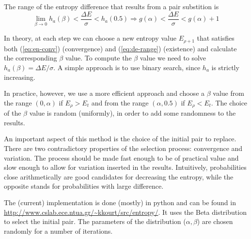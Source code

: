 \documentclass[9pt,a4paper]{article}
\begin{document}
The range of the entropy difference that results from a pair substition is
\begin{equation}
 \lim_{\beta \to 0}h_a(\beta) < \frac{\Delta E}{\sigma} <  h_a(0.5) \Rightarrow 
 g(\alpha) < \frac{\Delta E}{\sigma} < g(\alpha) + 1
 \label{eq:de-range}
\end{equation}


In theory, at each step we can choose a new entropy value \( E_{\rho+1} \) that
satisfies both (\ref{eq:en-conv})  (convergence) and (\ref{eq:de-range})
(existence) and calculate the corresponding $\beta$ value. To compute the
$\beta$ value we need to solve \( h_a(\beta) = {\Delta E}/\sigma \). A simple
approach is to use binary search, since $h_a$ is strictly increasing. 

In practice, however, we use a more efficient approach and choose a $\beta$
value from the range $(0,\alpha)$ if $E_\rho > E_t$ and from the range
$(\alpha,0.5)$ if  $E_\rho < E_t$. The choice of the $\beta$ value is random
(uniformly), in order to add some randomness to the results.

An important aspect of this method is the choice of the initial pair to
replace. There are two contradictory properties of the selection process:
convergence and variation. The process should be made fast enough to be of
practical value and slow enough to allow for variation inserted in the results.
Intuitively, probabilities close arithmetically are good candidates for
decreasing the entropy, while the opposite stands for probabilities with large
difference.

The (current) implementation is done (mostly) in python and can be found in
\url{http://www.cslab.ece.ntua.gr/~kkourt/src/entropy/}. It uses the Beta
distribution to select the initial pair. The parameters of the distribution
($\alpha, \beta$) are chosen randomly for a number of iterations. 

\end{document}
